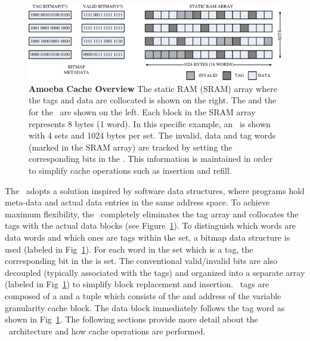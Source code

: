 \begin{figure}[h]
  \begin{center}
    \includegraphics[width=\textwidth]{files/Figures/06-AmoebaCacheArch.pdf}
    \caption[Amoeba Cache Overview]{\textbf{Amoeba Cache Overview} The static RAM (SRAM) array where the tags and data are collocated is shown on the right. The  and the  for the \AC\ are shown on the left. Each block in the SRAM array represents 8 bytes (1 word). In this specific example, an \AC\ is shown with 4 sets and 1024 bytes per set. The invalid, data and tag words (marked in the SRAM array) are tracked by setting the corresponding bits in the . This information is maintained in order to simplify cache operations such as insertion and refill. }
    \label{fig:amoeba_cache_arch}
  \end{center}
\end{figure}

The \AC\ adopts a solution inspired by software data structures, where programs hold meta-data and actual data entries in the same address space. To achieve maximum flexibility, the \AC\ completely eliminates the tag array and collocates the tags with the actual data blocks (see Figure~\ref{fig:amoeba_cache_arch}). To distinguish which words are data words and which ones are tags within the set, a bitmap data structure is used (labeled  in Fig~\ref{fig:amoeba_cache_arch}). For each word in the set which is a tag, the corresponding bit in the  is set. The conventional valid/invalid bits are also decoupled (typically associated with the tags) and organized into a separate array (labeled  in Fig~\ref{fig:amoeba_cache_arch}) to simplify block replacement and insertion. \AC\ tags are composed of a  and a tuple which consists of the  and  address of the variable granularity cache block. The data block immediately follows the tag word as shown in Fig~\ref{fig:amoeba_cache_arch}. The following sections provide more detail about the \AC\ architecture and how cache operations are performed.


